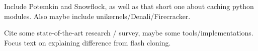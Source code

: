 Include Potemkin and Snowflock, as well as that short one about caching python
modules. Also maybe include unikernels/Denali/Firecracker.
~\cite{potemkin}\cite{snowflock}\cite{unikernels}\cite{denali}\cite{firecracker}

Cite some state-of-the-art research / survey, maybe some tools/implementations.
Focus text on explaining difference from flash cloning.~\cite{post-copy-migration}
